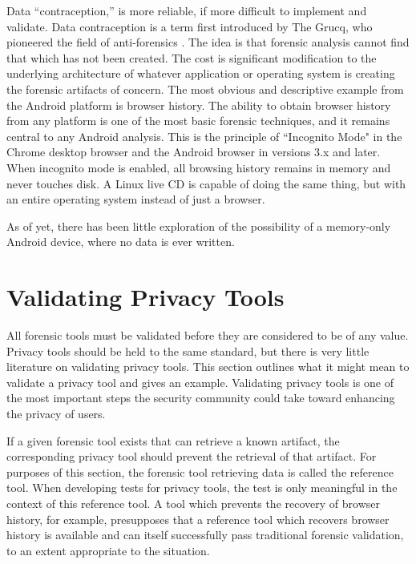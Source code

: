 Data ``contraception,'' is more reliable, if more difficult to implement and validate.  Data contraception is a term first
introduced by The Grucq, who pioneered the field of anti-forensics \cite{defiling}.  The idea is that forensic analysis cannot find
that which has not been created.  The cost is significant modification to the underlying architecture of whatever application or
operating system is creating the forensic artifacts of concern.  The most obvious and descriptive example from the Android platform
is browser history.  The ability to obtain browser history from any platform is one of the most basic forensic techniques, and it
remains central to any Android analysis.  This is the principle of ``Incognito Mode" in the Chrome desktop browser and the Android
browser in versions 3.x and later. When incognito mode is enabled, all browsing history remains in memory and never touches disk. A
Linux live CD is capable of doing the same thing, but with an entire operating system instead of just a browser.

As of yet, there has been little exploration of the possibility of a memory-only Android device, where no data is ever written. 


\section{Validating Privacy Tools}
All forensic tools must be validated before they are considered to be of any value. Privacy tools should be held to the same
standard, but there is very little literature on validating privacy tools. This section outlines what it might mean to validate a
privacy tool and gives an example. Validating privacy tools is one of the most important steps the security community could take
toward enhancing the privacy of users.

If a given forensic tool exists that can retrieve a known artifact, the corresponding privacy tool should prevent the retrieval of
that artifact. For purposes of this section, the forensic tool retrieving data is called the reference tool. When developing tests
for privacy tools, the test is only meaningful in the context of this reference tool. A tool which prevents the recovery of browser
history, for example, presupposes that a reference tool which recovers browser history is available and can itself successfully pass
traditional forensic validation, to an extent appropriate to the situation.

